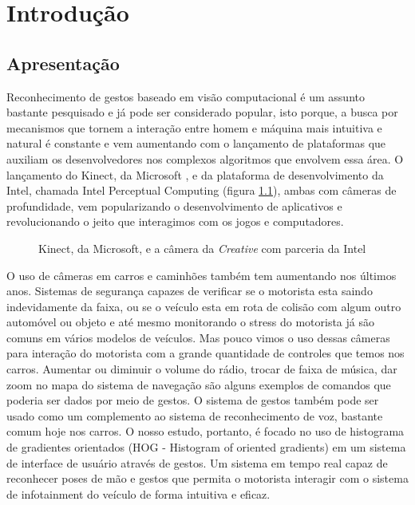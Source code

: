 \chapter{Introdução}

\section{Apresentação}

Reconhecimento de gestos baseado em visão computacional é um assunto bastante pesquisado e já pode ser considerado popular, isto porque, a busca por mecanismos que tornem a interação entre homem e máquina mais intuitiva e natural é constante e vem aumentando com o lançamento de plataformas que auxiliam os desenvolvedores nos complexos algoritmos que envolvem essa área.
O lançamento do Kinect, da Microsoft \cite{kinect}, e da plataforma de desenvolvimento da Intel, chamada Intel Perceptual Computing \cite{intel} (figura \ref{fig:depth_camera}),  ambas com câmeras de profundidade, vem popularizando o desenvolvimento de aplicativos e revolucionando o jeito que interagimos com os jogos e computadores. 

\begin{figure}[ht!]
\centering
{}
  \caption{Kinect, da Microsoft, e a câmera da \textit{Creative} com parceria da Intel}
  \label{fig:depth_camera}
\end{figure}

O uso de câmeras em carros e caminhões também tem aumentando nos últimos anos. Sistemas de segurança capazes de verificar se o motorista esta saindo indevidamente da faixa, ou se o veículo esta em rota de colisão com algum outro automóvel ou objeto e até mesmo monitorando o stress do motorista já são comuns em vários modelos de veículos. Mas pouco vimos o uso dessas câmeras para interação do motorista com a grande quantidade de controles que temos nos carros. Aumentar ou diminuir o volume do rádio, trocar de faixa de música, dar zoom no mapa do sistema de navegação são alguns exemplos de comandos que poderia ser dados por meio de gestos.
O sistema de gestos também pode ser usado como um complemento ao sistema de reconhecimento de voz, bastante comum hoje nos carros.
O nosso estudo, portanto, é focado no uso de histograma de gradientes orientados (HOG - Histogram of oriented gradients) em um sistema de interface de usuário através de gestos. Um sistema em tempo real capaz de reconhecer poses de mão e gestos que permita o motorista interagir com o sistema de infotainment do veículo de forma intuitiva e eficaz.

